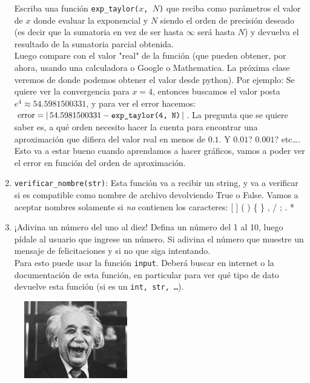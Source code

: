 \documentclass[a4paper]{article}
\begin{document}
\begin{enumerate}
		Escriba una función \texttt{exp\_taylor($x$, $N$)} que reciba como parámetros el valor de $x$ donde evaluar la exponencial y $N$ siendo el orden de precisión deseado (es decir que la sumatoria en vez de ser hasta $\infty$ será hasta $N$) y devuelva el resultado de la sumatoria parcial obtenida.\\
		Luego compare con el valor "real" de la función (que pueden obtener, por ahora, usando una calculadora o Google o Mathematica. La próxima clase veremos de donde podemos obtener el valor desde python). Por ejemplo: Se quiere ver la convergencia para $x=4$, entonces buscamos el valor posta $e^4 \approx 54.5981500331$, y para ver el error hacemos: $\textup{error} = |\,54.5981500331 - \texttt{exp\_taylor(4, N)}\,|$.
		La pregunta que se quiere saber es, a qué orden necesito hacer la cuenta para encontrar una aproximación que difiera del valor real en menos de $0.1$. Y $0.01$? $0.001$? etc\ldots.\\
		Esto va a estar bueno cuando aprendamos a hacer gráficos, vamos a poder ver el error en función del orden de aproximación.

	\item \texttt{verificar\_nombre(str)}: Esta función va a recibir un string, y va a verificar si es compatible como nombre de archivo devolviendo True o False. Vamos a aceptar nombres solamente si \emph{no} contienen los caracteres: [ ] ( ) \{ \} , / ; . *

	\item ¡Adivina un número del uno al diez! Defina un número del 1 al 10, luego pídale al usuario que ingrese un número. Si adivina el número que muestre un mensaje de felicitaciones y si no que siga intentando.\\
		Para esto puede usar la función \texttt{input}. Deberá buscar en internet o la documentación de esta función, en particular para ver qué tipo de dato devuelve esta función (si es un \texttt{int, str, \ldots}).
\end{enumerate}

\begin{figure}[H]
 \centering
 \includegraphics[width=0.4\textwidth]{einstein.jpeg}
 \label{Einstein}
 \end{figure}
\end{document}
